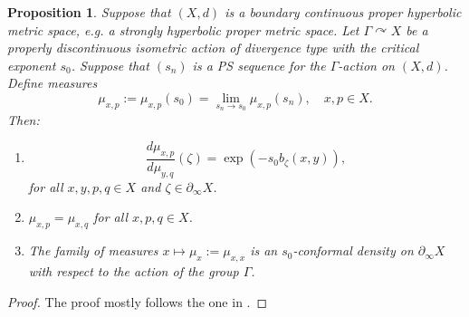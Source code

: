 \documentclass[12pt]{amsbook}%
\newtheorem{prop}[thm]{Proposition}
\theoremstyle{definition}
\theoremstyle{remark}
\numberwithin{section}{chapter}
\numberwithin{subsection}{section}
\numberwithin{figure}{chapter}
\DeclareMathOperator{\acts}{\curvearrowright}
\def\eps{\epsilon}
\def\Ga{\Gamma}
\def\geo{\partial_\infty}
\begin{document}
{{\begin{prop}\label{prop:conformal}
Suppose that $(X,d)$  is  a {\em boundary continuous proper hyperbolic metric space}, e.g. 
a strongly hyperbolic proper metric space. 
Let $\Ga\acts X$ be a properly discontinuous isometric action of divergence type with the critical exponent $s_0$. 
Suppose that $(s_n)$ is a PS sequence for the $\Ga$-action  on  $(X,d)$. Define measures
$$
\mu_{x,p}:=\mu_{x,p}(s_0)=\lim_{s_n\to s_0} \mu_{x,p}(s_n), \quad x, p\in X. 
$$
Then:

\begin{enumerate}
\item $$
\frac{d\mu_{x,p}}{d\mu_{y,q}} (\zeta) = \exp(-s_0 b_\zeta(x,y)),
$$
for all $x, y, p, q\in X$ and $ \zeta\in \geo X$. 

\item $\mu_{x,p}=\mu_{x,q}$ for all $x, p, q\in X$. %

\item The family of measures $x\mapsto \mu_x:=\mu_{x,x}$ is an $s_0$-conformal density on $\geo X$ with respect to the action of the group $\Ga$. 
\end{enumerate}
\end{prop}
\begin{proof} The proof mostly follows the one in \cite[Th\'eor\`eme 5.4]{Coo93}.  


\end{proof}}}
\end{document}
